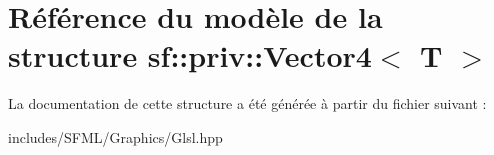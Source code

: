 \hypertarget{structsf_1_1priv_1_1Vector4}{}\section{Référence du modèle de la structure sf\+:\+:priv\+:\+:Vector4$<$ T $>$}
\label{structsf_1_1priv_1_1Vector4}


La documentation de cette structure a été générée à partir du fichier suivant \+:\begin{DoxyCompactItemize}
\item 
includes/\+S\+F\+M\+L/\+Graphics/Glsl.\+hpp\end{DoxyCompactItemize}
